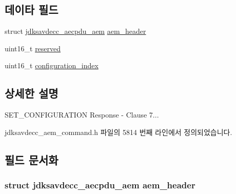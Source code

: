 \subsection*{데이타 필드}
\begin{DoxyCompactItemize}
\item 
struct \hyperlink{structjdksavdecc__aecpdu__aem}{jdksavdecc\+\_\+aecpdu\+\_\+aem} \hyperlink{structjdksavdecc__aem__command__set__configuration__response_ae1e77ccb75ff5021ad923221eab38294}{aem\+\_\+header}
\item 
uint16\+\_\+t \hyperlink{structjdksavdecc__aem__command__set__configuration__response_a5a6ed8c04a3db86066924b1a1bf4dad3}{reserved}
\item 
uint16\+\_\+t \hyperlink{structjdksavdecc__aem__command__set__configuration__response_afaad1bd7c66f9611e134d8c5ce98f444}{configuration\+\_\+index}
\end{DoxyCompactItemize}


\subsection{상세한 설명}
S\+E\+T\+\_\+\+C\+O\+N\+F\+I\+G\+U\+R\+A\+T\+I\+ON Response -\/ Clause 7... 

jdksavdecc\+\_\+aem\+\_\+command.\+h 파일의 5814 번째 라인에서 정의되었습니다.



\subsection{필드 문서화}
\subsubsection[{\texorpdfstring{aem\+\_\+header}{aem_header}}]{\setlength{\rightskip}{0pt plus 5cm}struct {\bf jdksavdecc\+\_\+aecpdu\+\_\+aem} aem\+\_\+header}\hypertarget{structjdksavdecc__aem__command__set__configuration__response_ae1e77ccb75ff5021ad923221eab38294}{}\label{structjdksavdecc__aem__command__set__configuration__response_ae1e77ccb75ff5021ad923221eab38294}



